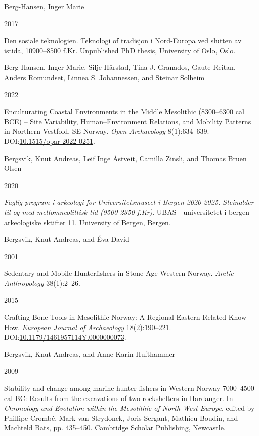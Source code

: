 \documentclass[
  12pt,
  a4paper,
  oneside]{book}
\newlength{\cslhangindent}
\newlength{\csllabelwidth}
\newlength{\cslentryspacingunit} %
\newenvironment{CSLReferences}[2] %
 {%
  \setlength{\parindent}{0pt}
  \ifodd #1
  \let\oldpar\par
  \def\par{\hangindent=\cslhangindent\oldpar}
  \fi
  \setlength{\parskip}{#2\cslentryspacingunit}
 }%
 {}
\newcommand{\CSLBlock}[1]{#1\hfill\break}
\newcommand{\CSLLeftMargin}[1]{\parbox[t]{\csllabelwidth}{#1}}
\newcommand{\CSLRightInline}[1]{\parbox[t]{\linewidth - \csllabelwidth}{#1}\break}
\begin{document}
\begin{CSLReferences}{0}{0}
\leavevmode{}%
\CSLBlock{Berg-Hansen, Inger Marie}
\CSLLeftMargin{ 2017}
\CSLRightInline{{Den sosiale teknologien. Teknologi of tradisjon i Nord-Europa ved slutten av istida, 10900--8500 f.Kr}. Unpublished PhD thesis, University of Oslo, Oslo.}

\leavevmode{}%
\CSLBlock{Berg-Hansen, Inger Marie, Silje Hårstad, Tina J. Granados, Gaute Reitan, Anders Romundset, Linnea S. Johannessen, and Steinar Solheim}
\CSLLeftMargin{ 2022}
\CSLRightInline{{Enculturating Coastal Environments in the Middle Mesolithic (8300--6300 cal BCE) -- Site Variability, Human--Environment Relations, and Mobility Patterns in Northern Vestfold, SE-Norway}. \emph{Open Archaeology} 8(1):634--639. DOI:\href{https://doi.org/10.1515/opar-2022-0251}{10.1515/opar-2022-0251}.}

\leavevmode{}%
\CSLBlock{Bergsvik, Knut Andreas, Leif Inge Åstveit, Camilla Zinsli, and Thomas Bruen Olsen}
\CSLLeftMargin{ 2020}
\CSLRightInline{\emph{{Faglig program i arkeologi for Universitetsmuseet i Bergen 2020-2025. Steinalder til og med mellomneolittisk tid (9500-2350 f.Kr)}}. UBAS - universitetet i bergen arkeologiske sktifter 11. University of Bergen, Bergen.}

\leavevmode{}%
\CSLBlock{Bergsvik, Knut Andreas, and Éva David}
\CSLLeftMargin{ 2001}
\CSLRightInline{{Sedentary and Mobile Hunterfishers in Stone Age Western Norway}. \emph{Arctic Anthropology} 38(1):2--26.}

\leavevmode{}%
\CSLLeftMargin{ 2015 }
\CSLRightInline{{Crafting Bone Tools in Mesolithic Norway: A Regional Eastern-Related Know-How}. \emph{European Journal of Archaeology} 18(2):190--221. DOI:\href{https://doi.org/10.1179/1461957114Y.0000000073}{10.1179/1461957114Y.0000000073}.}

\leavevmode{}%
\CSLBlock{Bergsvik, Knut Andreas, and Anne Karin Hufthammer}
\CSLLeftMargin{ 2009}
\CSLRightInline{{Stability and change among marine hunter-fishers in Western Norway 7000--4500 cal BC: Results from the excavations of two rockshelters in Hardanger}. In \emph{{Chronology and Evolution within the Mesolithic of North-West Europe}}, edited by Phillipe Crombé, Mark van Strydonck, Joris Sergant, Mathieu Boudin, and Machteld Bats, pp. 435--450. Cambridge Scholar Publishing, Newcastle.}


\end{CSLReferences}
\end{document}
